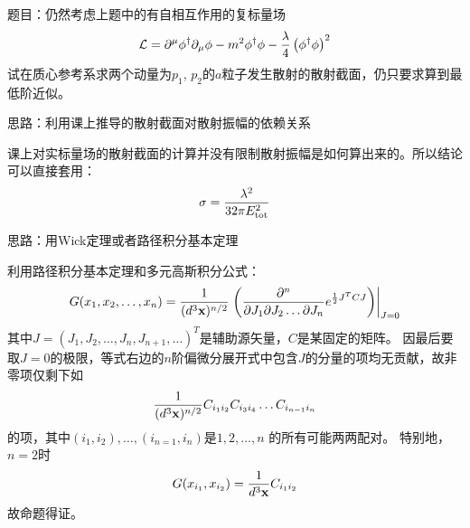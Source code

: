 \documentclass[CJK]{beamer}
\begin{document}
\begin{frame}
\bch
{\small
题目：仍然考虑上题中的有自相互作用的复标量场
$$ {\mathcal{L}} = \partial^\mu\phi^\dagger \partial_\mu \phi - m^2\phi^\dagger\phi - \frac{\lambda}{4}\left(\phi^\dagger\phi\right)^2$$
试在质心参考系求两个动量为$p_1$, $p_2$的$a$粒子发生散射的散射截面，仍只要求算到最低阶近似。
}

\skipline
{\small
思路：利用课上推导的散射截面对散射振幅的依赖关系}

\ech
\end{frame}

\begin{frame}
\bch
{\small
课上对实标量场的散射截面的计算并没有限制散射振幅是如何算出来的。所以结论可以直接套用：
$$\sigma = \frac{\lambda^2}{32\pi E^2_{\rm tot}}$$
}
\ech
\end{frame}



\begin{frame}

\skiplines
{\small 思路：用Wick定理或者路径积分基本定理}
\ech
\end{frame}


\begin{frame}
\ech
\end{frame}

\begin{frame}
\bch
{\small 
利用路径积分基本定理和多元高斯积分公式：
$$G(x_1, x_2,\ldots,x_n) =  \frac{1}{(d^3{\mathbf{x}})^{n/2}}\left.\left(\frac{\partial^n}{\partial J_1 \partial J_2\ldots\partial J_n} e^{\frac{1}{2}J^TCJ}\right)\right\vert_{J=0}$$
其中$J = (J_1, J_2, \ldots, J_n, J_{n+1}, \ldots)^T$是辅助源矢量，$C$是某固定的矩阵。
因最后要取$J=0$的极限，等式右边的$n$阶偏微分展开式中包含$J$的分量的项均无贡献，故非零项仅剩下如
$$\frac{1}{(d^3{\mathbf{x}})^{n/2}} C_{i_1 i_2}C_{i_3 i_4} \ldots C_{i_{n-1}i_n}$$
的项，其中$(i_1, i_2), \ldots, (i_{n=1},i_n)$是$1,2,\ldots, n$ 的所有可能两两配对。
特别地，$n=2$时
$$G(x_{i_1},x_{i_2}) = \frac{1}{d^3{\mathbf{x}}}C_{i_1i_2}$$
故命题得证。
}
\ech
\end{frame}
\end{document}
